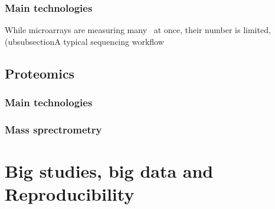     \subsubsection{Main technologies}
While microarrays are measuring many \mRNAs\ at once, their number is limited,
     (ubsubsection{A typical sequencing workflow}
\subsection{Proteomics}
    \subsubsection{Main technologies}
    \subsubsection{Mass sprectrometry}

\section{Big studies, big data and Reproducibility}



\begin{comment}
\subsection{Reproducibility issues}
        \begin{itemize}
            \item{Different samples}
            \item{Technology: wet lab but also software: Rupgrade, ....}
            \item{missing meta-data}
        \end{itemize}
    \subsection{Main concerns}
        \subsubsection{Detection}
        \subsubsection{Quantification}
    \subsection{Consistency through biological layers}
\end{comment}


